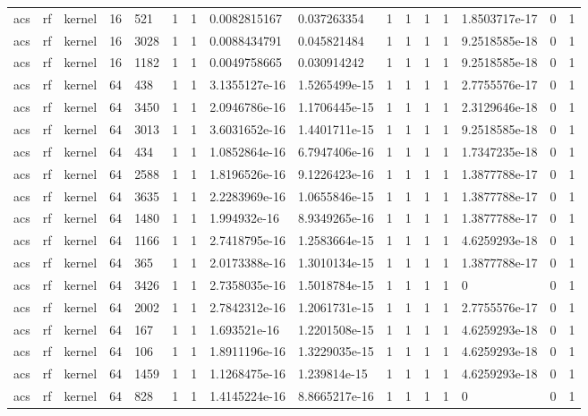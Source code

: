 \begin{tabular}{llllllllllllllll}
acs & rf & kernel & 16 & 521 & 1 & 1 & 0.0082815167 & 0.037263354 & 1 & 1 & 1 & 1 & 1.8503717e-17 & 0 & 1 \\
acs & rf & kernel & 16 & 3028 & 1 & 1 & 0.0088434791 & 0.045821484 & 1 & 1 & 1 & 1 & 9.2518585e-18 & 0 & 1 \\
acs & rf & kernel & 16 & 1182 & 1 & 1 & 0.0049758665 & 0.030914242 & 1 & 1 & 1 & 1 & 9.2518585e-18 & 0 & 1 \\
acs & rf & kernel & 64 & 438 & 1 & 1 & 3.1355127e-16 & 1.5265499e-15 & 1 & 1 & 1 & 1 & 2.7755576e-17 & 0 & 1 \\
acs & rf & kernel & 64 & 3450 & 1 & 1 & 2.0946786e-16 & 1.1706445e-15 & 1 & 1 & 1 & 1 & 2.3129646e-18 & 0 & 1 \\
acs & rf & kernel & 64 & 3013 & 1 & 1 & 3.6031652e-16 & 1.4401711e-15 & 1 & 1 & 1 & 1 & 9.2518585e-18 & 0 & 1 \\
acs & rf & kernel & 64 & 434 & 1 & 1 & 1.0852864e-16 & 6.7947406e-16 & 1 & 1 & 1 & 1 & 1.7347235e-18 & 0 & 1 \\
acs & rf & kernel & 64 & 2588 & 1 & 1 & 1.8196526e-16 & 9.1226423e-16 & 1 & 1 & 1 & 1 & 1.3877788e-17 & 0 & 1 \\
acs & rf & kernel & 64 & 3635 & 1 & 1 & 2.2283969e-16 & 1.0655846e-15 & 1 & 1 & 1 & 1 & 1.3877788e-17 & 0 & 1 \\
acs & rf & kernel & 64 & 1480 & 1 & 1 & 1.994932e-16 & 8.9349265e-16 & 1 & 1 & 1 & 1 & 1.3877788e-17 & 0 & 1 \\
acs & rf & kernel & 64 & 1166 & 1 & 1 & 2.7418795e-16 & 1.2583664e-15 & 1 & 1 & 1 & 1 & 4.6259293e-18 & 0 & 1 \\
acs & rf & kernel & 64 & 365 & 1 & 1 & 2.0173388e-16 & 1.3010134e-15 & 1 & 1 & 1 & 1 & 1.3877788e-17 & 0 & 1 \\
acs & rf & kernel & 64 & 3426 & 1 & 1 & 2.7358035e-16 & 1.5018784e-15 & 1 & 1 & 1 & 1 & 0 & 0 & 1 \\
acs & rf & kernel & 64 & 2002 & 1 & 1 & 2.7842312e-16 & 1.2061731e-15 & 1 & 1 & 1 & 1 & 2.7755576e-17 & 0 & 1 \\
acs & rf & kernel & 64 & 167 & 1 & 1 & 1.693521e-16 & 1.2201508e-15 & 1 & 1 & 1 & 1 & 4.6259293e-18 & 0 & 1 \\
acs & rf & kernel & 64 & 106 & 1 & 1 & 1.8911196e-16 & 1.3229035e-15 & 1 & 1 & 1 & 1 & 4.6259293e-18 & 0 & 1 \\
acs & rf & kernel & 64 & 1459 & 1 & 1 & 1.1268475e-16 & 1.239814e-15 & 1 & 1 & 1 & 1 & 4.6259293e-18 & 0 & 1 \\
acs & rf & kernel & 64 & 828 & 1 & 1 & 1.4145224e-16 & 8.8665217e-16 & 1 & 1 & 1 & 1 & 0 & 0 & 1 \\

\end{tabular}
